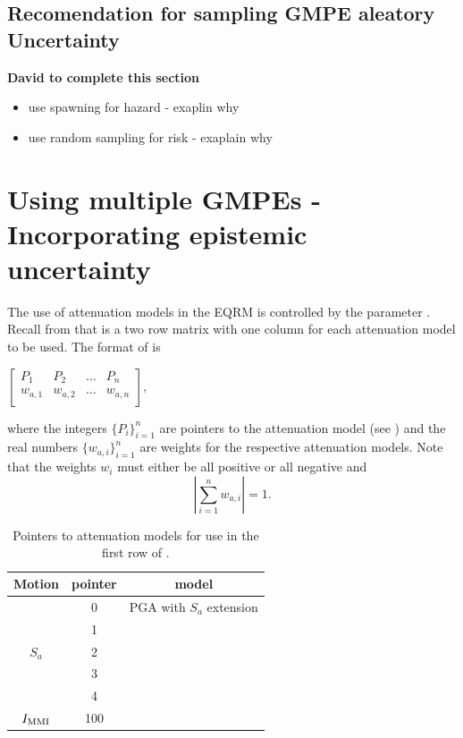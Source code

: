 \subsection{Recomendation for sampling GMPE aleatory Uncertainty}

\textbf{David to complete this section}
\begin{itemize}
\item use spawning for hazard - exaplin why
\item use random sampling for risk - exaplain why
\end{itemize}

\section{Using multiple GMPEs - Incorporating epistemic uncertainty}
\label{sec:attn-multi-attnmodels}

The use of attenuation models in the EQRM is controlled by the
 parameter .
Recall from  that
 is a two row matrix with one
column for each attenuation model to be used. The format of
 is
\begin{center}
\begin{math}
 \left[ \begin{array}{ccccc}
P_1 & P_2 &  \hdots & P_n \\
w_{a,1} & w_{a,2} &  \hdots & w_{a,n} \\
\end{array} \right],
\end{math}
\end{center}
where the integers $\{P_i\}_{i=1}^n$ are pointers to the
attenuation model (see ) and the real numbers
$\{w_{a,i}\}_{i=1}^n$ are weights for the respective attenuation
models. Note that the weights $w_i$ must either be all positive or
all negative and
\begin{equation}
\left|\sum_{i=1}^{n}w_{a,i}\right| = 1.
\end{equation}
\begin{table}
\caption{Pointers to attenuation models for use in the first row
of .} \vspace{0.8em}
\label{tab:attn-flags}
\begin{center}
\begin{tabular}{|c|c|c|}
\hline \textbf{Motion} & \textbf{pointer} & \textbf{model} \\
\hline
 & 0 & \cite{dr_Gaull90a} PGA with $S_a$ extension\\
 & 1 & \cite{dr_Toro97a} \\
$S_a$ & 2 & \cite{dr_Atkinson97a} \\
 & 3 & \cite{dr_Sadigh97a} \\
 & 4 & \cite{dr_Somerville01a} \\
\hline
 $\Imm$ & 100 & \cite{dr_Gaull90a} \\
\hline
\end{tabular}
\end{center}
\end{table}

